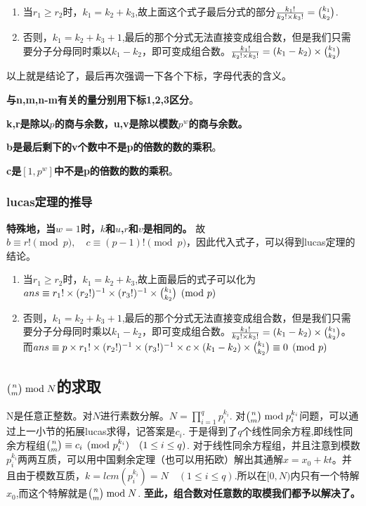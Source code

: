 \begin{enumerate}
	\item 当$r_1 \geq r_2$时，$k_1=k_2+k_3$,故上面这个式子最后分式的部分$\frac{{k_1}!}{{k_2}! \times {k_3}!}=\tbinom{k_1}{k_2}$.
	\item 否则，$k_1=k_2+k_3+1$,最后的那个分式无法直接变成组合数，但是我们只需要分子分母同时乘以$k_1-k_2$，即可变成组合数。$\frac{{k_1}!}{{k_2}! \times {k_3}!}=(k_1-k_2) \times \tbinom{k_1}{k_2}$
\end{enumerate}
以上就是结论了，最后再次强调一下各个下标，字母代表的含义。
\par \textbf{与n,m,n-m有关的量分别用下标1,2,3区分}。
\par \textbf{k,r是除以$p$的商与余数，u,v是除以模数$p^w$的商与余数。}
\par \textbf{b是最后剩下的v个数中不是p的倍数的数的乘积}。
\par \textbf{c是$\left[1,p^w\right]$中不是p的倍数的数的乘积}。
\subsubsection{lucas定理的推导}
\textbf{特殊地，当$w=1$时，$k$和$u$,$r$和$v$是相同的。}
故$b \equiv r! \pmod{p},\quad c \equiv (p-1)! \pmod{p}$，因此代入式子，可以得到lucas定理的结论。
\begin{enumerate}
	\item 当$r_1 \geq r_2$时，$k_1=k_2+k_3$,故上面最后的式子可以化为$ans \equiv {
		{r_1}! \times ({r_2}!)^{-1} \times ({r_3}!)^{-1} \times \tbinom{k_1}{k_2} \pmod{p}
	}
	$
	\item 否则，$k_1=k_2+k_3+1$,最后的那个分式无法直接变成组合数，但是我们只需要分子分母同时乘以$k_1-k_2$，即可变成组合数。$\frac{{k_1}!}{{k_2}! \times {k_3}!}=(k_1-k_2) \times \tbinom{k_1}{k_2}$。而$ans \equiv {
		p \times {r_1}! \times ({r_2}!)^{-1} \times ({r_3}!)^{-1} \times c \times (k_1-k_2) \times \tbinom{k_1}{k_2}
	} \equiv 0 \pmod{p}
	$
\end{enumerate}
\subsection{$\tbinom{n}{m} \bmod N$的求取}
N是任意正整数。对$N$进行素数分解。$N=\prod\limits_{i=1}^{q}p_i^{k_i}$.
对$\tbinom{n}{m} \bmod p_i^{k_i}$问题，可以通过上一小节的拓展lucas求得，记答案是$c_i$.
于是得到了$q$个线性同余方程,即线性同余方程组$\tbinom{n}{m} \equiv c_i \pmod{p_i^{k_i}} \quad (1 \leq i \leq q)$.
对于线性同余方程组，并且注意到模数$p_i^{k_i}$两两互质，可以用中国剩余定理（也可以用拓欧）解出其通解$x=x_0+kt$。并且由于模数互质，$k=lcm(p_i^{k_i})=N \quad (1 \leq i \leq q)$.所以在$[0,N)$内只有一个特解$x_0$,而这个特解就是$\tbinom{n}{m} \bmod N$.
\textbf{至此，组合数对任意数的取模我们都予以解决了。}